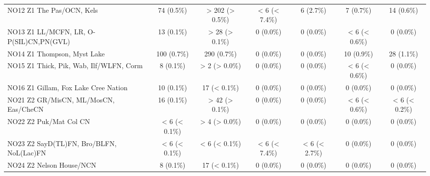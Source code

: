 \documentclass{article}
\begin{document}
\begin{table}[htbp]
\begin{tabular}{l*{6}{c}}
  NO12 Z1 The Pas/OCN, Kels                             &            74 (0.5\%)           &         > 202 (> 0.5\%)         &          < 6 (< 7.4\%)          &            6 (2.7\%)            &            7 (0.7\%)            &            14 (0.6\%)           \\
  NO13 Z1 LL/MCFN, LR, O-P(SIL)CN,PN(GVL)               &            13 (0.1\%)           &          > 28 (> 0.1\%)         &            0 (0.0\%)            &            0 (0.0\%)            &          < 6 (< 0.6\%)          &            0 (0.0\%)            \\
  NO14 Z1 Thompson, Myst Lake                           &           100 (0.7\%)           &           290 (0.7\%)           &            0 (0.0\%)            &            0 (0.0\%)            &            10 (0.9\%)           &            28 (1.1\%)           \\
  NO15 Z1 Thick, Pik, Wab, Ilf/WLFN, Corm               &            8 (0.1\%)            &          > 2 (> 0.0\%)          &            0 (0.0\%)            &            0 (0.0\%)            &          < 6 (< 0.6\%)          &            0 (0.0\%)            \\
  NO16 Z1 Gillam, Fox Lake Cree Nation                  &            10 (0.1\%)           &           17 (< 0.1\%)          &            0 (0.0\%)            &            0 (0.0\%)            &            0 (0.0\%)            &            0 (0.0\%)            \\
  NO21 Z2 GR/MisCN, ML/MosCN, Eas/CheCN                 &            16 (0.1\%)           &          > 42 (> 0.1\%)         &            0 (0.0\%)            &            0 (0.0\%)            &          < 6 (< 0.6\%)          &          < 6 (< 0.2\%)          \\
  NO22 Z2 Puk/Mat Col CN                                &          < 6 (< 0.1\%)          &          > 4 (> 0.0\%)          &            0 (0.0\%)            &            0 (0.0\%)            &            0 (0.0\%)            &            0 (0.0\%)            \\
  NO23 Z2 SayD(TL)FN, Bro/BLFN, NoL(Lac)FN              &          < 6 (< 0.1\%)          &          < 6 (< 0.1\%)          &          < 6 (< 7.4\%)          &          < 6 (< 2.7\%)          &            0 (0.0\%)            &            0 (0.0\%)            \\
  NO24 Z2 Nelson House/NCN                              &            8 (0.1\%)            &           17 (< 0.1\%)          &            0 (0.0\%)            &            0 (0.0\%)            &            0 (0.0\%)            &            0 (0.0\%)            \\

\end{tabular}
\end{table}
\end{document}
